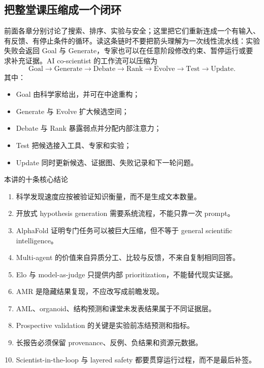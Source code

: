 \documentclass[a4paper]{article}
\begin{document}
\subsection{把整堂课压缩成一个闭环}

前面各章分别讨论了搜索、排序、实验与安全；这里把它们重新连成一个有输入、有反馈、有停止条件的循环。读这条链时不要把箭头理解为一次线性流水线：实验失败会返回 Goal 与 Generate，专家也可以在任意阶段修改约束、暂停运行或要求补充证据。AI co-scientist 的工作流可以压缩为
$$
\text{Goal}
\rightarrow \text{Generate}
\rightarrow \text{Debate}
\rightarrow \text{Rank}
\rightarrow \text{Evolve}
\rightarrow \text{Test}
\rightarrow \text{Update}.
$$
其中：
\begin{itemize}
  \item Goal 由科学家给出，并可在中途重构；
  \item Generate 与 Evolve 扩大候选空间；
  \item Debate 与 Rank 暴露弱点并分配内部注意力；
  \item Test 把候选接入工具、专家和实验；
  \item Update 同时更新候选、证据图、失败记录和下一轮问题。
\end{itemize}

\begin{importantbox}{本讲的十条核心结论}
\begin{enumerate}
  \item 科学发现速度应按被验证知识衡量，而不是生成文本数量。
  \item 开放式 hypothesis generation 需要系统流程，不能只靠一次 prompt。
  \item AlphaFold 证明专门任务可以被巨大压缩，但不等于 general scientific intelligence。
  \item Multi-agent 的价值来自异质分工、比较与反馈，不来自复制相同回答。
  \item Elo 与 model-as-judge 只提供内部 prioritization，不能替代现实证据。
  \item AMR 是隐藏结果复现，不应改写成前瞻发现。
  \item AML、organoid、结构预测和课堂未发表结果属于不同证据层。
  \item Prospective validation 的关键是实验前冻结预测和指标。
  \item 长报告必须保留 provenance、反例、负结果和资源元数据。
  \item Scientist-in-the-loop 与 layered safety 都要贯穿运行过程，而不是最后补签。
\end{enumerate}
\end{importantbox}
\end{document}
